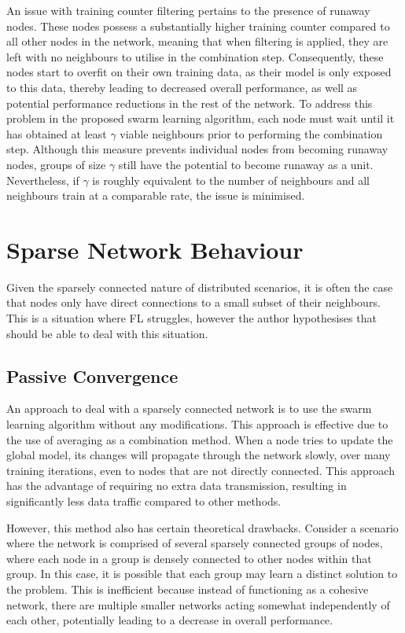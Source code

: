 An issue with training counter filtering pertains to the presence of runaway nodes. These nodes possess a substantially higher training counter compared to all other nodes in the network, meaning that when filtering is applied, they are left with no neighbours to utilise in the combination step. Consequently, these nodes start to overfit on their own training data, as their model is only exposed to this data, thereby leading to decreased overall performance, as well as potential performance reductions in the rest of the network. To address this problem in the proposed swarm learning algorithm, each node must wait until it has obtained at least $\gamma$ viable neighbours prior to performing the combination step. Although this measure prevents individual nodes from becoming runaway nodes, groups of size $\gamma$ still have the potential to become runaway as a unit. Nevertheless, if $\gamma$ is roughly equivalent to the number of neighbours and all neighbours train at a comparable rate, the issue is minimised.

\section{Sparse Network Behaviour}
Given the sparsely connected nature of distributed scenarios, it is often the case that nodes only have direct connections to a small subset of their neighbours. This is a situation where FL struggles, however the author hypothesises that \SL should be able to deal with this situation.

\subsection{Passive Convergence}
An approach to deal with a sparsely connected network is to use the swarm learning algorithm without any modifications. This approach is effective due to the use of averaging as a combination method. When a node tries to update the global model, its changes will propagate through the network slowly, over many training iterations, even to nodes that are not directly connected. This approach has the advantage of requiring no extra data transmission, resulting in significantly less data traffic compared to other methods.

However, this method also has certain theoretical drawbacks. Consider a scenario where the network is comprised of several sparsely connected groups of nodes, where each node in a group is densely connected to other nodes within that group. In this case, it is possible that each group may learn a distinct solution to the problem. This is inefficient because instead of functioning as a cohesive network, there are multiple smaller networks acting somewhat independently of each other, potentially leading to a decrease in overall performance.


